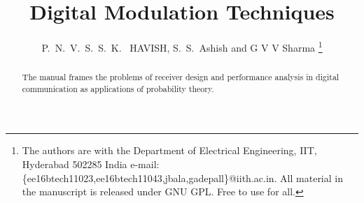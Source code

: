 \documentclass[journal,12pt,twocolumn]{IEEEtran}
\begin{document}
\title{
Digital Modulation Techniques
}
%
%
%

\author{P.~N.~V.~S.~S.~K.~ HAVISH, S.~S.~Ashish and G V V Sharma %
\thanks{The authors are with the Department
of Electrical Engineering, IIT, Hyderabad
502285 India e-mail: \{ee16btech11023,ee16btech11043,jbala,gadepall\}@iith.ac.in. All material in the manuscript is released under GNU GPL.  Free to use for all.
}}



\maketitle

\tableofcontents

\bigskip

\begin{abstract}
The manual frames the problems of receiver design and performance analysis in digital communication as applications of probability theory.

\end{abstract}




%
\IEEEpeerreviewmaketitle
\end{document}
